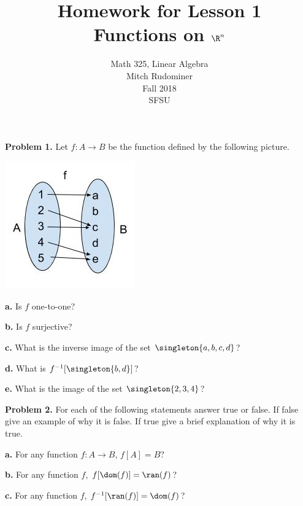 \documentclass[oneside,12pt]{amsart}
\begin{document}
\title{Homework for Lesson 1 \\ Functions on $\R^n$}
\author{Math 325, Linear Algebra \\ Mitch Rudominer \\ Fall 2018 \\ SFSU }
\date{}

\maketitle


\textbf{Problem 1.} Let $f:A\to B$ be the function defined by the following
picture.

\includegraphics[scale=0.25]{hw_function1}

\textbf{a.} Is $f$ one-to-one?

\smallskip

\textbf{b.} Is $f$ surjective?

\smallskip

\textbf{c.} What is the inverse image of the set $\singleton{a,b,c,d}$?

\medskip

\textbf{d.} What is $f^{-1}[\singleton{b, d}]$?

\medskip

\textbf{e.} What is the image of the set $\singleton{2,3,4}$?

\bigskip

\textbf{Problem 2.} For each of the following statements answer true or
false. If false give an example of why it is false. If true give a brief
explanation of why it is true.

\smallskip

\textbf{a.} For any function $f:A\to B$, $f[A] = B$?

\bigskip
\bigskip

\textbf{b.} For any function $f$, $f[\dom(f)] = \ran(f)$?

\bigskip
\bigskip

\textbf{c.} For any function $f$, $f^{-1}[\ran(f)] = \dom(f)$?
\end{document}
